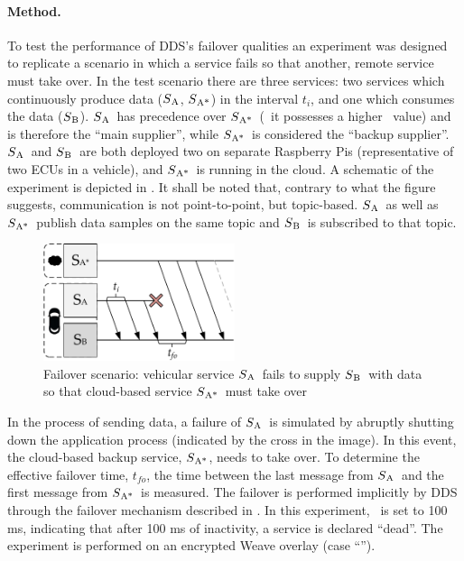 \newcommand{\proda}{$S\textsubscript{A}$}
\newcommand{\prodb}{$S\textsubscript{A*}$}
\newcommand{\cons}{$S\textsubscript{B}$}

\paragraph{Method.} To test the performance of DDS's failover qualities an experiment was designed to replicate a scenario in which a service fails so that another, remote service must take over. In the test scenario there are three services: two services which continuously produce data (\proda , \prodb) in the interval $t_i$, and one which consumes the data (\cons). \proda\ has precedence over \prodb\ (\ie\ it possesses a higher \ownership\ value) and is therefore the ``main supplier'', while \prodb\ is considered the ``backup supplier''. \proda\ and \cons\ are both deployed two on separate Raspberry Pis (representative of two ECUs in a vehicle), and \prodb\ is running in the cloud. A schematic of the experiment is depicted in . It shall be noted that, contrary to what the figure suggests, communication is not point-to-point, but topic-based. \proda\ as well as \prodb\ publish data samples on the same topic and \cons\ is subscribed to that topic.
\begin{figure}[htpb]
  \centering
  \includegraphics[width=0.5\textwidth]{figures/takeover}
  \caption[Failover experiment schematic]{Failover scenario: vehicular service \proda\ fails to supply \cons\ with data so that cloud-based service \prodb\ must take over}\label{fig:failover}
\end{figure}

In the process of sending data, a failure of \proda\ is simulated by abruptly shutting down the application process (indicated by the cross in the image). In this event, the cloud-based backup service, \prodb , needs to take over. To determine the effective failover time, $t_{fo}$, the time between the last message from \proda\ and the first message from \prodb\ is measured. The failover is performed implicitly by DDS through the failover mechanism described in . In this experiment, \liveliness\ is set to 100 ms, indicating that after 100 ms of inactivity, a service is declared ``dead''. The experiment is performed on an encrypted Weave overlay (case ``'').

